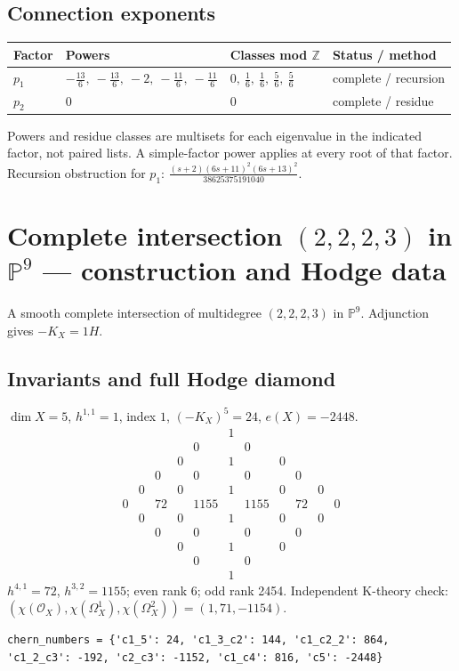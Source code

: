 \documentclass[10pt,a4paper]{article}
\begin{document}
\subsection*{Connection exponents}
\begin{center}\begin{tabular}{llll}\toprule Factor & Powers & Classes mod $\mathbb Z$ & Status / method\\\midrule
$p_{1}$ & $- \frac{13}{6},\ - \frac{13}{6},\ -2,\ - \frac{11}{6},\ - \frac{11}{6}$ & $0,\ \frac{1}{6},\ \frac{1}{6},\ \frac{5}{6},\ \frac{5}{6}$ & complete / recursion\\
$p_{2}$ & $0$ & $0$ & complete / residue\\
\bottomrule\end{tabular}\end{center}
Powers and residue classes are multisets for each eigenvalue in the indicated factor, not paired lists. A simple-factor power applies at every root of that factor.
Recursion obstruction for $p_{1}$: $\frac{\left(s + 2\right) \left(6 s + 11\right)^{2} \left(6 s + 13\right)^{2}}{38625375191040}$.
\clearpage\section*{Complete intersection $(2,2,2,3)$ in $\mathbb P^{9}$ --- construction and Hodge data}\label{entry:PCI5-2-2-2-3}
A smooth complete intersection of multidegree $(2,2,2,3)$ in $\mathbb P^{9}$.
Adjunction gives $-K_X=1H$.
\subsection*{Invariants and full Hodge diamond}
$\dim X=5$, $h^{1,1}=1$, index $1$, $(-K_X)^5=24$, $e(X)=-2448$.
\[\begin{array}{ccccccccccc}&&&&&1&&&&&\\&&&&0&&0&&&&\\&&&0&&1&&0&&&\\&&0&&0&&0&&0&&\\&0&&0&&1&&0&&0&\\0&&72&&1155&&1155&&72&&0\\&0&&0&&1&&0&&0&\\&&0&&0&&0&&0&&\\&&&0&&1&&0&&&\\&&&&0&&0&&&&\\&&&&&1&&&&&\end{array}\]
$h^{4,1}=72$, $h^{3,2}=1155$; even rank 6; odd rank 2454.
Independent K-theory check: $(\chi(\mathcal O_X),\chi(\Omega_X^1),\chi(\Omega_X^2))=(1, 71, -1154)$.
\begin{lstlisting}
chern_numbers = {'c1_5': 24, 'c1_3_c2': 144, 'c1_c2_2': 864, 'c1_2_c3': -192, 'c2_c3': -1152, 'c1_c4': 816, 'c5': -2448}
\end{lstlisting}
\end{document}
